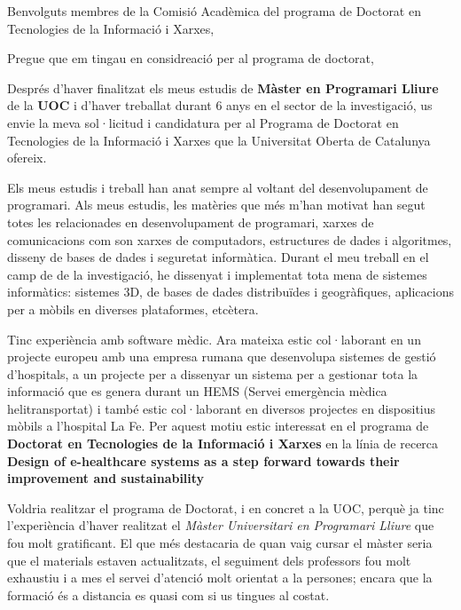 
%
%


\date{\today}
\opening{Benvolguts membres de la Comisió Acadèmica del programa de Doctorat en Tecnologies de la Informació i Xarxes,}
\closing{Pregue que em tingau en considreació per al programa de doctorat,}




\makelettertitle

Després d'haver finalitzat els meus estudis de \textbf{Màster en Programari Lliure} de la \textbf{UOC} i d'haver treballat durant 6 anys en el sector de la investigació, us envie la meva sol·licitud i candidatura per al Programa de Doctorat en Tecnologies de la Informació i Xarxes que la Universitat Oberta de Catalunya ofereix.

Els meus estudis i treball han anat sempre al voltant del desenvolupament de programari. Als meus estudis, les matèries que més m'han motivat han segut totes les relacionades en desenvolupament de programari, xarxes de comunicacions com son xarxes de computadors, estructures de dades i algoritmes, disseny de bases de dades i seguretat informàtica. Durant el meu treball en el camp de de la investigació, he dissenyat i implementat tota mena de sistemes informàtics: sistemes 3D, de bases de dades distribuïdes i geogràfiques, aplicacions per a mòbils en diverses plataformes, etcètera.

Tinc experiència amb software mèdic. Ara mateixa estic col·laborant en un projecte europeu amb una empresa rumana que desenvolupa sistemes de gestió d'hospitals, a un projecte per a dissenyar un sistema per a gestionar tota la informació que es genera durant un HEMS (Servei emergència mèdica helitransportat) i també estic col·laborant en diversos projectes en dispositius mòbils a l'hospital La Fe.  Per aquest motiu estic interessat en el programa de \textbf{Doctorat en Tecnologies de la Informació i Xarxes} en la línia de recerca \textbf{Design of e-healthcare systems as a step forward towards their improvement and sustainability} 

Voldria realitzar el programa de Doctorat, i en concret a la UOC, perquè ja tinc l'experiència d'haver realitzat el \textit{Màster Universitari en Programari Lliure} que fou molt gratificant. El que més destacaria de quan vaig cursar el màster seria que el materials estaven actualitzats, el seguiment dels professors fou molt exhaustiu i a mes el servei d'atenció molt orientat a la persones; encara que la formació és a distancia es quasi com si us tingues al costat. 


\makeletterclosing

\clearpage
